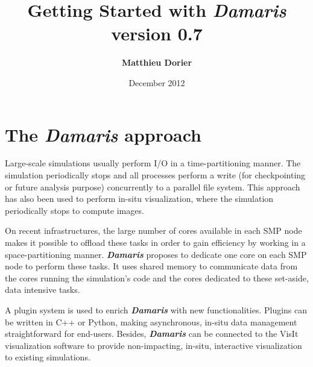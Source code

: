 \documentclass[11pt]{report}
\newcommand{\Damaris}{\emph{\textbf{Damaris}}}
\begin{document}
\title{\Huge{ 
	 Getting Started with \Damaris{}} \\
	\normalsize{} version 0.7}

\author{\textbf{Matthieu Dorier}}
\date{December 2012}
\maketitle

\setcounter{tocdepth}{1}
\tableofcontents

\chapter*{The \Damaris{} approach}

Large-scale simulations usually perform I/O in a time-partitioning manner.
The simulation periodically stops and all processes perform a write (for checkpointing
or future analysis purpose) concurrently to a parallel file system. This approach has also been
used to perform in-situ visualization, where the simulation periodically stops to compute images.

On recent infrastructures, the large number of cores available in each SMP node makes
it possible to offload these tasks in order to gain efficiency by working in a space-partitioning manner.
\Damaris{} proposes to dedicate one core on each SMP node to perform these tasks.
It uses shared memory to communicate data from the cores running the simulation's code and
the cores dedicated to these set-aside, data intensive tasks.

A plugin system is used to enrich \Damaris{} with new functionalities. Plugins can be written
in C++ or Python, making asynchronous, in-situ data management straightforward for end-users.
Besides, \Damaris{} can be connected to the VisIt visualization software to provide
non-impacting, in-situ, interactive visualization to existing simulations.



\end{document}
